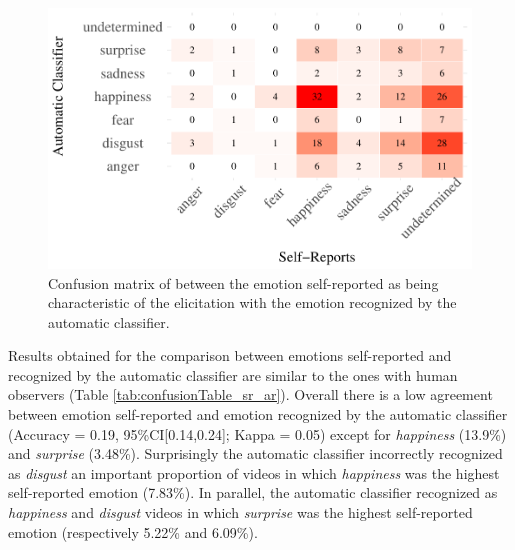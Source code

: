 \documentclass[conference,final,]{IEEEtran}
\makeatletter
\def\maxwidth{\ifdim\Gin@nat@width>\linewidth\linewidth
\else\Gin@nat@width\fi}
\let\Oldincludegraphics\includegraphics
\renewcommand{\includegraphics}[1]{\Oldincludegraphics[width=\maxwidth]{#1}}
\makeatother
\begin{document}
\begin{figure}
\centering
\includegraphics{ACII_2019_paper_files/figure-latex/confusionMatrix_sr_ar-1.pdf}
\caption{Confusion matrix of between the emotion self-reported as being
characteristic of the elicitation with the emotion recognized by the
automatic classifier.}
\end{figure}

Results obtained for the comparison between emotions self-reported and
recognized by the automatic classifier are similar to the ones with
human observers (Table \ref{tab:confusionTable_sr_ar}). Overall there is
a low agreement between emotion self-reported and emotion recognized by
the automatic classifier (Accuracy = 0.19, 95\%CI{[}0.14,0.24{]}; Kappa
= 0.05) except for \emph{happiness} (13.9\%) and \emph{surprise}
(3.48\%). Surprisingly the automatic classifier incorrectly recognized
as \emph{disgust} an important proportion of videos in which
\emph{happiness} was the highest self-reported emotion (7.83\%). In
parallel, the automatic classifier recognized as \emph{happiness} and
\emph{disgust} videos in which \emph{surprise} was the highest
self-reported emotion (respectively 5.22\% and 6.09\%).
\end{document}
